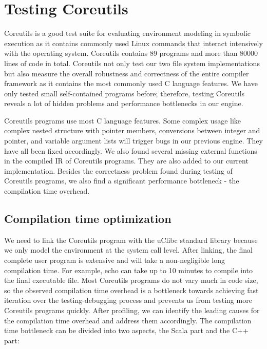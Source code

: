 \documentclass[sigplan, nonacm]{acmart}\settopmatter{printfolios=true,printccs=false,printacmref=false}
\begin{document}
\section{Testing Coreutils}\label{coreutilstests}
Coreutils is a good test suite for evaluating environment modeling in symbolic execution as it contains commonly used Linux commands that interact intensively with the operating system. Coreutils contains 89 programs and more than 80000 lines of code in total. Coreutils not only test our two file system implementations but also measure the overall robustness and correctness of the entire compiler framework as it contains the most commonly used C language features. We have only tested small self-contained programs before; therefore, testing Coreutils reveals a lot of hidden problems and performance bottlenecks in our engine.\par
Coreutils programs use most C language features. Some complex usage like complex nested structure with pointer members, conversions between integer and pointer, and variable argument lists will trigger bugs in our previous engine. They have all been fixed accordingly. We also found several missing external functions in the compiled IR of Coreutils programs. They are also added to our current implementation. Besides the correctness problem found during testing of Coreutils programs, we also find a significant performance bottleneck - the compilation time overhead.
\subsection{Compilation time optimization}
We need to link the Coreutils program with the uClibc \cite{uclibcweb} standard library because we only model the environment at the system call level. After linking, the final complete user program is extensive and will take a non-negligible long compilation time. For example, echo can take up to 10 minutes to compile into the final executable file. Most Coreutils programs do not vary much in code size, so the observed compilation time overhead is a bottleneck towards achieving fast iteration over the testing-debugging process and prevents us from testing more Coreutils programs quickly. After profiling, we can identify the leading causes for the compilation time overhead and address them accordingly. The compilation time bottleneck can be divided into two aspects, the Scala part and the C++ part:
\end{document}
